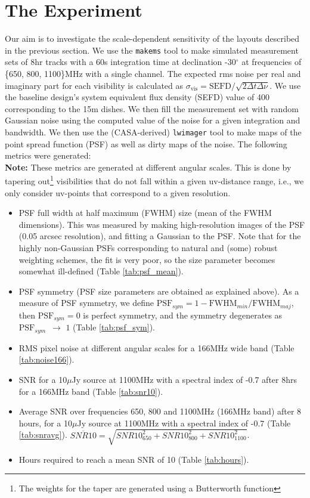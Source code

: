 \documentclass[sfheadings,a4paper,times,10pt,floats,floatfix]{article}
\begin{document}
\section{The Experiment}\label{sec:exp}
\vspace{-.2cm}
Our aim is to investigate the scale-dependent sensitivity of the layouts described in the previous section. We use the
\texttt{makems} tool to make simulated measurement sets of 8hr tracks with a 60s integration time at declination -30$^\circ$ at
frequencies of \{650, 800, 1100\}MHz with a single channel. The expected rms noise per real and imaginary part for each visibility
is calculated as $\sigma_{\text{vis}} = \text{SEFD}/\sqrt{2\Delta t\Delta \nu}$. We use the baseline design's system
equivalent flux density (SEFD) value of 400 corresponding to the 15m dishes. We then fill the measurement set with random
Gaussian noise using the computed value of the noise for a given integration and bandwidth. We then use the (CASA-derived)
\texttt{lwimager} tool to make maps of the point spread function (PSF) as well as dirty maps of the noise. The following metrics
were generated:\\ {\bf Note:} These metrics are generated at different angular scales. This is done by tapering out\footnote{The
weights for the taper are generated using a Butterworth function } visibilities that do not fall within a given uv-distance
range, i.e., we only consider uv-points that correspond to a given resolution.             
                                                                   
\begin{itemize}
 \item PSF full width at half maximum (FWHM) size (mean of the FWHM dimensions). This was measured by making high-resolution
images of the PSF (0.05 arcsec resolution), and fitting a Gaussian to the PSF. Note that for the highly non-Gaussian PSFs
corresponding to natural and (some) robust weighting schemes, the fit is very poor, so the size parameter becomes somewhat
ill-defined (Table \ref{tab:psf_mean}).
 \item PSF symmetry (PSF size parameters are obtained as explained above). As a measure of PSF symmetry, we define 
$\text{PSF}_{sym}=1-\text{FWHM}_{min}/\text{FWHM}_{maj}$, then $\text{PSF}_{sym} = 0$ is perfect symmetry, and the symmetry
degenerates as $\text{PSF}_{sym}\,\,\, \rightarrow\,\,1$ (Table \ref{tab:psf_sym}).

 \item RMS pixel noise at different angular scales for a 166MHz wide band (Table \ref{tab:noise166}).
 
 \item SNR for a 10$\mu$Jy source at 1100MHz with a spectral index of -0.7 after 8hrs for a 166MHz band (Table \ref{tab:snr10}).
 \item Average SNR over frequencies 650, 800 and 1100MHz (166MHz band)
   after 8 hours, for a 10$\mu$Jy source at 1100MHz
with a spectral index of -0.7 (Table \ref{tab:snravg}). {$\overline{SNR10}=\sqrt{SNR10_{650}^2 + SNR10_{800}^2 +
SNR10_{1100}^2}$}.
 \item Hours required to reach a mean SNR of 10 (Table \ref{tab:hours}).
\end{itemize}
\end{document}
